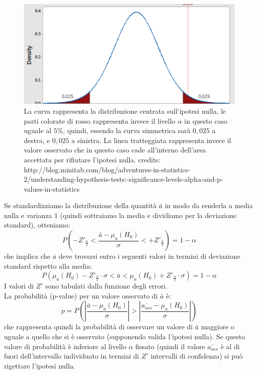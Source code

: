\begin{figure}
	\centering
	\includegraphics[scale= 0.3]{Immagini/distro-pvalue.png}
	\caption{La curva rappresenta la distribuzione centrata sull'ipotesi nulla, le parti colorate di rosso rappresenta invece il livello $\alpha$ in questo caso uguale al $5\%$, quindi, essendo la curva simmetrica sarà $0,025$ a destra, e $0,025$ a sinistra. La linea tratteggiata rappresenta invece il valore osservato che in questo caso cade all'interno dell'area accettata per rifiutare l'ipotesi nulla.
		credits: http://blog.minitab.com/blog/adventures-in-statistics-2/understanding-hypothesis-tests:-significance-levels-alpha-and-p-values-in-statistics}
	\label{fig: distro-pvalue}
\end{figure}
Se standardizziamo la distribuzione della quantità $\bar{a}$ in modo da renderla a media nulla e varianza 1 (quindi sottraiamo la media e dividiamo per la deviazione standard), otteniamo:
\begin{equation}
P\left(-Z'_{\frac{\alpha}{2}}< \frac{\bar{a} - \mu_a(H_0)}{\sigma} < +Z'_{\frac{\alpha}{2}}\right) = 1 - \alpha
\end{equation}
che implica che $\bar{a}$ deve trovarsi entro i seguenti valori in termini di deviazione standard rispetto alla media:
\begin{equation}
\label{eq: prob-interna}
P\left(\mu_a(H_0) - Z'_{\frac{\alpha}{2}} \cdot \sigma < \bar{a} < \mu_a(H_0) + Z'_{\frac{\alpha}{2}} \cdot \sigma \right) = 1 - \alpha
\end{equation}
I valori di $Z'$ sono tabulati dalla funzione degli errori.\\
La probabilità (p-value) per un valore osservato di $\bar{a}$ è:
\begin{equation}
p = P\left( \left| \frac{\bar{a} - \mu_a(H_0)}{\sigma} \right| > \left| \frac{\bar{a_{oss}} - \mu_a(H_0)}{\sigma} \right| \right)
\end{equation}
che rappresenta quindi la probabilità di osservare un valore di $\bar{a}$ maggiore o uguale a quello che si è osservato (supponendo valida l'ipotesi nulla). Se questo valore di probabilità è inferiore al livello $\alpha$ fissato (quindi il valore $\bar{a_{oss}}$ è al di fuori dell'intervallo individuato in termini di $Z'$ intervalli di confidenza) si può rigettare l'ipotesi nulla.

